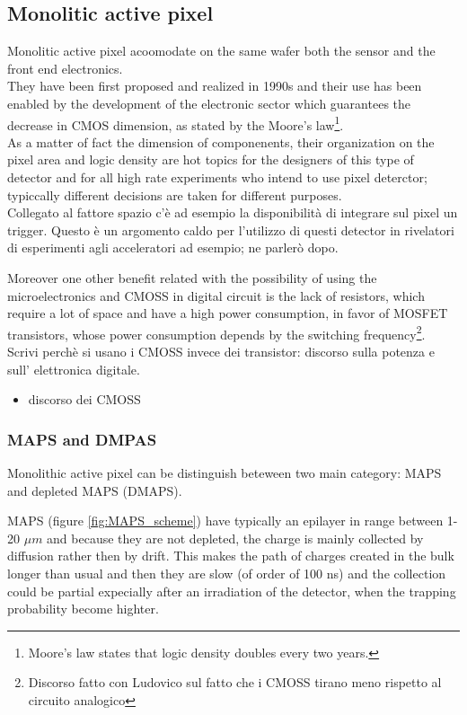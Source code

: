 \begin{titlepage}
\subsection{Monolitic active pixel}
Monolitic active pixel acoomodate on the same wafer both the sensor and the front
end electronics.\\
They have been first proposed and realized in 1990s and their use has been enabled
by the development of the electronic sector which guarantees the decrease in CMOS
dimension, as stated by the Moore's law\footnote{Moore's law states that logic
density doubles every two years.}.\\
As a matter of fact the dimension of componenents, their organization on the
pixel area and logic density are hot topics for the designers of this type of detector
and for all high rate experiments who intend to use pixel deterctor; typiccally
different decisions are taken for different purposes. \\
Collegato al fattore spazio c'è ad esempio la disponibilità di integrare sul pixel un trigger.
Questo è un argomento caldo per l'utilizzo di questi detector in rivelatori di esperimenti
agli acceleratori ad esempio; ne parlerò dopo.

Moreover one other benefit related with the possibility of using the microelectronics
and CMOSS in digital circuit is the lack of resistors, which require a lot of
space and have a high power consumption, in favor of MOSFET transistors, whose power
consumption depends by the switching frequency\footnote{Discorso fatto con Ludovico
sul fatto che i CMOSS tirano meno rispetto al circuito analogico}.
Scrivi perchè si usano i CMOSS invece dei transistor: discorso sulla potenza e sull'
elettronica digitale.
\begin{itemize}
\item discorso dei CMOSS
\end{itemize}

\subsubsection{MAPS and DMPAS}
Monolithic active pixel can be distinguish beteween two main category: MAPS and depleted
MAPS (DMAPS).

MAPS (figure \ref{fig:MAPS_scheme}) have typically an epilayer in range between 1-20 $\mu m$ and because they
are not depleted, the charge is mainly collected by diffusion rather then by drift.
This makes the path of charges created in the bulk longer than usual and then they are
slow (of order of 100 ns) and the collection could be partial expecially after
an irradiation of the detector, when the trapping probability become highter.


\end{titlepage}
